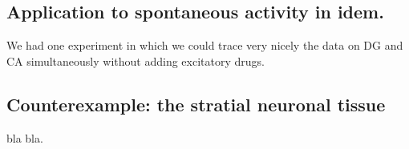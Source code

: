 \documentclass[12pt, letterpaper]{article}
\begin{document}
\subsection{Application to spontaneous activity in idem.}

We had one experiment in which we could trace very nicely the data on DG and CA simultaneously without adding excitatory drugs. 

\subsection{Counterexample: the stratial neuronal tissue}

bla bla.


 
\end{document}
